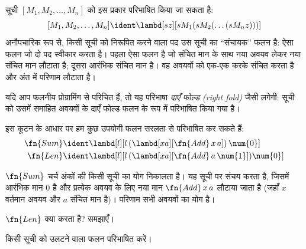 \documentclass[../../../include/open-logic-section]{subfiles}
\begin{document}

सूची $[M_1, M_2, \ldots, M_n]$ को इस प्रकार परिभाषित किया जा सकता है:
\[
  [M_1, M_2, \ldots, M_n] \ident \lambd[sz][s M_1 (s M_2 (\ldots (s M_n z)))]
\]
अनौपचारिक रूप से, किसी सूची को निरूपित करने वाला पद उस सूची का ``संचायक''
फलन है: ऐसा फलन जो दो पद स्वीकार करता है। पहला ऐसा फलन है जो संचित मान के
साथ नया अवयव लेकर नया संचित मान लौटाता है; दूसरा आरंभिक संचित मान है। वह
अवयवों को एक-एक करके संचित करता है और अंत में परिणाम लौटाता है।

\begin{digress}
  यदि आप फलनीय प्रोग्रामिंग से परिचित हैं, तो यह परिभाषा \emph{दाएँ फोल्ड
  (right fold)} जैसी लगेगी: सूची को उसमें समाहित अवयवों के दाएँ फोल्ड फलन
  के रूप में परिभाषित किया गया है।
\end{digress}

इस कूटन के आधार पर हम कुछ उपयोगी फलन सरलता से परिभाषित कर सकते हैं:
\begin{align*}
  \fn{Sum} & \ident
  \lambd[l][l \, (\lambd[xa][\fn{Add} \, x \, a])\,  \num{0}]\\
  \fn{Len} & \ident
  \lambd[l][l \, (\lambd[xa][\fn{Add} \, a \, \num{1}]) \num{0}]
\end{align*}

$\fn{Sum}$ चर्च अंकों की किसी सूची का योग निकालता है। यह सूची पर संचय करता
है, जिसमें आरंभिक मान $\num{0}$ है और प्रत्येक अवयव के लिए नया मान
$\fn{Add} \, x\, a$ लौटाया जाता है (जहाँ $x$ वर्तमान अवयव और $a$ संचित
मान है)। परिणाम सभी अवयवों का योग है।

\begin{prob}
  $\fn{Len}$ क्या करता है? समझाएँ।
\end{prob}

\begin{prob}
  किसी सूची को उलटने वाला फलन परिभाषित करें।
\end{prob}
\end{document}
